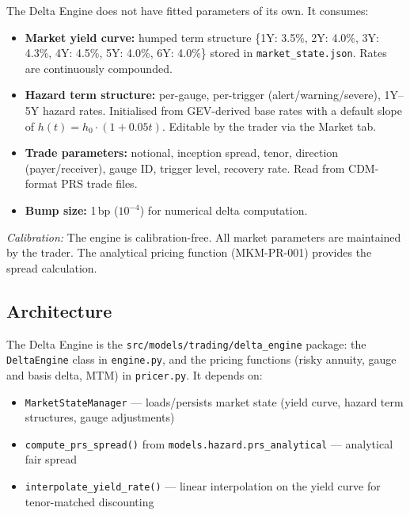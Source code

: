 \documentclass[11pt,a4paper]{article}
\begin{document}
The Delta Engine does not have fitted parameters of its own. It consumes:

\begin{itemize}
    \item \textbf{Market yield curve:} humped term structure \{1Y: 3.5\%, 2Y: 4.0\%, 3Y: 4.3\%, 4Y: 4.5\%, 5Y: 4.0\%, 6Y: 4.0\%\} stored in \texttt{market\_state.json}. Rates are continuously compounded.
    \item \textbf{Hazard term structure:} per-gauge, per-trigger (alert/warning/severe), 1Y--5Y hazard rates. Initialised from GEV-derived base rates with a default slope of $h(t) = h_0 \cdot (1 + 0.05t)$. Editable by the trader via the Market tab.
    \item \textbf{Trade parameters:} notional, inception spread, tenor, direction (payer/receiver), gauge ID, trigger level, recovery rate. Read from CDM-format PRS trade files.
    \item \textbf{Bump size:} 1\,bp ($10^{-4}$) for numerical delta computation.
\end{itemize}

\emph{Calibration:} The engine is calibration-free. All market parameters are maintained by the trader. The analytical pricing function (MKM-PR-001) provides the spread calculation.

\clearpage

\mkmimplementation

\subsection{Architecture}

The Delta Engine is the \texttt{src/models/trading/delta\_engine} package: the \texttt{DeltaEngine} class in \texttt{engine.py}, and the pricing functions (risky annuity, gauge and basis delta, MTM) in \texttt{pricer.py}. It depends on:
\begin{itemize}
    \item \texttt{MarketStateManager} --- loads/persists market state (yield curve, hazard term structures, gauge adjustments)
    \item \texttt{compute\_prs\_spread()} from \texttt{models.hazard.prs\_analytical} --- analytical fair spread
    \item \texttt{interpolate\_yield\_rate()} --- linear interpolation on the yield curve for tenor-matched discounting
\end{itemize}
\end{document}
